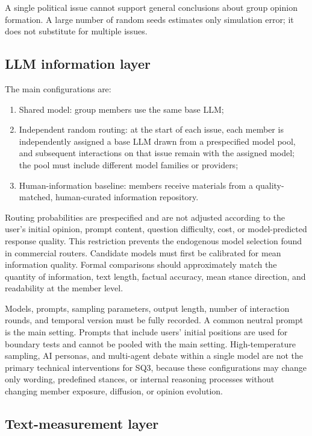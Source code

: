 \documentclass[11pt,a4paper]{article}
\begin{document}
A single political issue cannot support general conclusions about group opinion formation. A large number of random seeds estimates only simulation error; it does not substitute for multiple issues.

\subsection{LLM information layer}

The main configurations are:

\begin{enumerate}
\item Shared model: group members use the same base LLM;
\item Independent random routing: at the start of each issue, each member is independently assigned a base LLM drawn from a prespecified model pool, and subsequent interactions on that issue remain with the assigned model; the pool must include different model families or providers;
\item Human-information baseline: members receive materials from a quality-matched, human-curated information repository.
\end{enumerate}

Routing probabilities are prespecified and are not adjusted according to the user's initial opinion, prompt content, question difficulty, cost, or model-predicted response quality. This restriction prevents the endogenous model selection found in commercial routers. Candidate models must first be calibrated for mean information quality. Formal comparisons should approximately match the quantity of information, text length, factual accuracy, mean stance direction, and readability at the member level.

Models, prompts, sampling parameters, output length, number of interaction rounds, and temporal version must be fully recorded. A common neutral prompt is the main setting. Prompts that include users' initial positions are used for boundary tests and cannot be pooled with the main setting. High-temperature sampling, AI personas, and multi-agent debate within a single model are not the primary technical interventions for SQ3, because these configurations may change only wording, predefined stances, or internal reasoning processes without changing member exposure, diffusion, or opinion evolution.

\subsection{Text-measurement layer}
\end{document}
